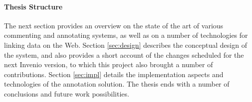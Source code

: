 
\paragraph{Thesis Structure} The next section provides an overview on the state
of the art of various commenting and annotating systems, as well as on a number
of technologies for linking data on the Web. Section \ref{sec:design} describes
the conceptual design of the system, and also provides a short account of the
changes scheduled for the next Invenio version, to which this project also
brought a number of contributions. Section \ref{sec:impl} details the
implementation aspects and technologies of the annotation solution. The thesis
ends with a number of conclusions and future work possibilities.
